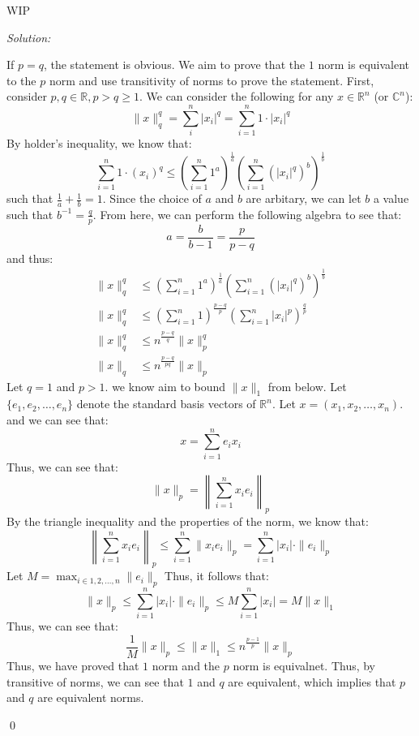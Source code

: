 \documentclass[12pt]{article}
\newenvironment{problem}[2][Problem]{\begin{trivlist}
\item[\hskip \labelsep {\bfseries #1}\hskip \labelsep {\bfseries #2.}]}{\end{trivlist}}
\newenvironment{sol}
    {\emph{Solution:}
    }
    {
    \qed
    }
\newcommand{\R}{\mathbb{R}}
\newcommand{\C}{\mathbb{C}}
\begin{document}
\begin{problem}{3}
    WIP
\end{problem}
\begin{sol}
    If $p = q$, the statement is obvious. We aim to prove that the $1$ norm is equivalent to the $p$ norm and use transitivity of norms to prove the statement. First, consider $p, q \in \R, p > q \geq 1$. We can consider the following for any $x \in \R^n$ (or $\C^n$):
    \[
    \|x \|_q^q = \sum_{i}^n |x_i|^q = \sum_{i =1}^{n} 1 \cdot |x_i|^q
    \]
    By holder's inequality, we know that:
    \[
    \sum_{i=1}^{n} 1 \cdot (x_i)^q \leq \left( \sum_{i = 1}^{n} 1^a \right)^\frac{1}{a} \left( \sum_{i = 1}^{n} (|x_i|^q)^b \right)^\frac{1}{b}
    \]
    such that $\frac{1}{a} + \frac{1}{b} = 1$. Since the choice of $a$ and $b$ are arbitary, we can let $b$ a value such that $b^{-1} = \frac{q}{p}$. From here, we can perform the following algebra to see that:
    \[
    a = \frac{b }{b-1} = \frac{p}{p-q}
    \]
    and thus:
    \begin{align*}
        \|x\|_q^q & \leq \left( \sum_{i = 1}^{n} 1^a \right)^\frac{1}{a} \left( \sum_{i = 1}^{n} (|x_i|^q)^b \right)^\frac{1}{b}\\
        \|x\|_q^q &\leq \left( \sum_{i = 1}^{n} 1 \right)^\frac{p-q}{p} \left( \sum_{i = 1}^{n} |x_i|^p \right)^\frac{q}{p}\\
        \|x\|_q^q  & \leq n^\frac{p-q}{q} \| x\|_p^q\\
        \|x\|_q & \leq n^\frac{p-q}{pq} \|x\|_p
    \end{align*}
    Let $q = 1$ and $p > 1$. we know aim to bound $\|x\|_1$ from below. Let $\{e_1, e_2, \dots, e_n\}$ denote the standard basis vectors of $\R^n$. Let $x = (x_1, x_2, \dots, x_n)$. and we can see that:
    \[
    x = \sum_{i=1}^{n} e_i x_i
    \]
    Thus, we can see that:
    \[
    \|x\|_p = \left\| \sum_{i=1}^{n} x_i e_i \right \|_p 
    \]
    By the triangle inequality and the properties of the norm, we know that:
    \[
        \left\| \sum_{i=1}^{n} x_i e_i \right \|_p \leq \sum_{i=1}^{n} \|x_i e_i\|_p = \sum_{i=1}^{n} |x_i| \cdot \|e_i\|_p
    \]
    Let $M = \max_{i \in 1,2,\dots, n} \|e_i\|_p$ Thus, it follows that:
    \[
    \|x\|_p \leq \sum_{i=1}^{n}  |x_i| \cdot \|e_i\|_p \leq M \sum_{i=1}^{n} |x_i| = M \|x\|_1
    \]
    Thus, we can see that:
    \[
    \frac{1}{M} \|x\|_p \leq \|x\|_1 \leq n^\frac{p-1}{p} \|x\|_p
    \]
    Thus, we have proved that $1$ norm and the $p$ norm is equivalnet. Thus, by transitive of norms, we can see that $1$ and $q$ are equivalent, which implies that $p$ and $q$ are equivalent norms.
\end{sol}
\end{document}
